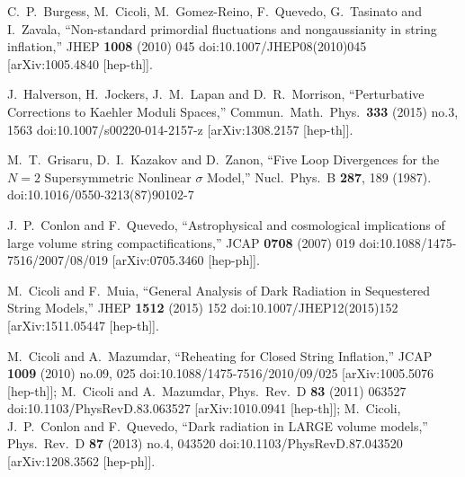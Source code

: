 \documentclass[11pt,a4paper]{article}
\begin{document}
\begin{thebibliography}{99}
  C.~P.~Burgess, M.~Cicoli, M.~Gomez-Reino, F.~Quevedo, G.~Tasinato and I.~Zavala,
  ``Non-standard primordial fluctuations and nongaussianity in string inflation,''
  JHEP {\bf 1008} (2010) 045
  doi:10.1007/JHEP08(2010)045
  [arXiv:1005.4840 [hep-th]].

  J.~Halverson, H.~Jockers, J.~M.~Lapan and D.~R.~Morrison,
  ``Perturbative Corrections to Kaehler Moduli Spaces,''
  Commun.\ Math.\ Phys.\  {\bf 333} (2015) no.3,  1563
  doi:10.1007/s00220-014-2157-z
  [arXiv:1308.2157 [hep-th]].

  M.~T.~Grisaru, D.~I.~Kazakov and D.~Zanon,
  ``Five Loop Divergences for the $N=2$ Supersymmetric Nonlinear $\sigma$ Model,''
  Nucl.\ Phys.\ B {\bf 287}, 189 (1987).
  doi:10.1016/0550-3213(87)90102-7
  
  J.~P.~Conlon and F.~Quevedo,
  ``Astrophysical and cosmological implications of large volume string compactifications,''
  JCAP {\bf 0708} (2007) 019
  doi:10.1088/1475-7516/2007/08/019
  [arXiv:0705.3460 [hep-ph]].

  M.~Cicoli and F.~Muia,
  ``General Analysis of Dark Radiation in Sequestered String Models,''
  JHEP {\bf 1512} (2015) 152
  doi:10.1007/JHEP12(2015)152
  [arXiv:1511.05447 [hep-th]].

M.~Cicoli and A.~Mazumdar,
  ``Reheating for Closed String Inflation,''
  JCAP {\bf 1009} (2010) no.09,  025
  doi:10.1088/1475-7516/2010/09/025
  [arXiv:1005.5076 [hep-th]];
M.~Cicoli and A.~Mazumdar,
  Phys.\ Rev.\ D {\bf 83} (2011) 063527
  doi:10.1103/PhysRevD.83.063527
  [arXiv:1010.0941 [hep-th]];
M.~Cicoli, J.~P.~Conlon and F.~Quevedo,
  ``Dark radiation in LARGE volume models,''
  Phys.\ Rev.\ D {\bf 87} (2013) no.4,  043520
  doi:10.1103/PhysRevD.87.043520
  [arXiv:1208.3562 [hep-ph]].

\end{thebibliography}
\end{document}
